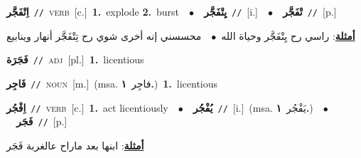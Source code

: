 \documentclass[10pt,a4paper,twoside]{article} %
\begin{document}
\begin{multicols}{2}
{{{{{{{{{\setlength\topsep{0pt}\textbf{\foreignlanguage{arabic}{اِتْفَجَّر}}\ {\color{gray}\texttt{//}\color{black}}\ \textsc{verb}\ [c.]\ \textbf{1.}~explode  \textbf{2.}~burst\ \ $\bullet$\ \ \setlength\topsep{0pt}\textbf{\foreignlanguage{arabic}{يِتْفَجَّر}}\ {\color{gray}\texttt{//}\color{black}}\ [i.]\ \ $\bullet$\ \ \setlength\topsep{0pt}\textbf{\foreignlanguage{arabic}{تْفَجَّر}}\ {\color{gray}\texttt{//}\color{black}}\ [p.]\  \begin{flushright}\color{gray}\foreignlanguage{arabic}{\textbf{\underline{\foreignlanguage{arabic}{أمثلة}}}: راسي رح يِتْفَجَّر وحياة الله\ $\bullet$\ \  محسسني إنه أخرى شوي رح تِتْفَجَّر أنهار وينابيع}\end{flushright}\color{black}} \vspace{2mm}

{\setlength\topsep{0pt}\textbf{\foreignlanguage{arabic}{فَجَرَة}}\ {\color{gray}\texttt{//}\color{black}}\ \textsc{adj}\ [pl.]\ \textbf{1.}~licentious\ 

{\setlength\topsep{0pt}\textbf{\foreignlanguage{arabic}{فَاجِر}}\ {\color{gray}\texttt{//}\color{black}}\ \textsc{noun}\ [m.]\ \color{gray}(msa. \foreignlanguage{arabic}{فاجِر}~\foreignlanguage{arabic}{\textbf{١.}})\color{black}\ \textbf{1.}~licentious\ 

{\setlength\topsep{0pt}\textbf{\foreignlanguage{arabic}{اِفْجُر}}\ {\color{gray}\texttt{//}\color{black}}\ \textsc{verb}\ [c.]\ \textbf{1.}~act licentiously\ \ $\bullet$\ \ \setlength\topsep{0pt}\textbf{\foreignlanguage{arabic}{يُفْجُر}}\ {\color{gray}\texttt{//}\color{black}}\ [i.]\ \color{gray}(msa. \foreignlanguage{arabic}{يَفْجُر}~\foreignlanguage{arabic}{\textbf{١.}})\color{black}\ \ $\bullet$\ \ \setlength\topsep{0pt}\textbf{\foreignlanguage{arabic}{فَجَر}}\ {\color{gray}\texttt{//}\color{black}}\ [p.]\  \begin{flushright}\color{gray}\foreignlanguage{arabic}{\textbf{\underline{\foreignlanguage{arabic}{أمثلة}}}: ابنها بعد ماراح عالغربة فَجَر}\end{flushright}\color{black}} \vspace{2mm}

}}}}}}}}}}
\end{multicols}
\end{document}
